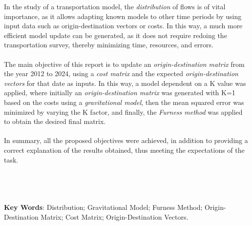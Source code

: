 \documentclass[12pt]{article} %
\begin{document}
\begin{titlepage}
\begin{justify}
  In the study of a transportation model, the \textit{distribution} of flows is of vital importance, as it allows adapting known models to other time periods by using input data such as origin-destination vectors or costs. In this way, a much more efficient model update can be generated, as it does not require redoing the transportation survey, thereby minimizing time, resources, and errors.
  \\ \\
  The main objective of this report is to update an \textit{origin-destination matrix} from the year 2012 to 2024, using a \textit{cost matrix} and the expected \textit{origin-destination vectors} for that date as inputs. In this way, a model dependent on a K value was applied, where initially an \textit{origin-destination matrix} was generated with K=1 based on the costs using a \textit{gravitational model}, then the mean squared error was minimized by varying the K factor, and finally, the \textit{Furness method} was applied to obtain the desired final matrix.
  \\ \\
  In summary, all the proposed objectives were achieved, in addition to providing a correct explanation of the results obtained, thus meeting the expectations of the task.
  \\ \\ \\ \\ \\
  \textbf{Key Words}: Distribution; Gravitational Model; Furness Method; Origin-Destination Matrix; Cost Matrix; Origin-Destination Vectors.
\end{justify}


\vspace{1cm}

\end{titlepage}


\end{document}
